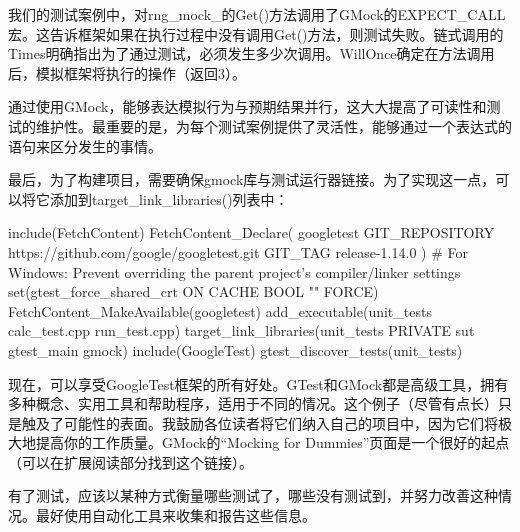 我们的测试案例中，对rng\_mock\_的Get()方法调用了GMock的EXPECT\_CALL宏。这告诉框架如果在执行过程中没有调用Get()方法，则测试失败。链式调用的Times明确指出为了通过测试，必须发生多少次调用。WillOnce确定在方法调用后，模拟框架将执行的操作（返回3）。

通过使用GMock，能够表达模拟行为与预期结果并行，这大大提高了可读性和测试的维护性。最重要的是，为每个测试案例提供了灵活性，能够通过一个表达式的语句来区分发生的事情。

最后，为了构建项目，需要确保gmock库与测试运行器链接。为了实现这一点，可以将它添加到target\_link\_libraries()列表中：


\begin{cmake}
include(FetchContent)
FetchContent_Declare(
    googletest
    GIT_REPOSITORY https://github.com/google/googletest.git
    GIT_TAG release-1.14.0
)
# For Windows: Prevent overriding the parent project's compiler/linker settings
set(gtest_force_shared_crt ON CACHE BOOL "" FORCE)
FetchContent_MakeAvailable(googletest)
add_executable(unit_tests
               calc_test.cpp
               run_test.cpp)
target_link_libraries(unit_tests PRIVATE sut gtest_main gmock)
include(GoogleTest)
gtest_discover_tests(unit_tests)
\end{cmake}

现在，可以享受GoogleTest框架的所有好处。GTest和GMock都是高级工具，拥有多种概念、实用工具和帮助程序，适用于不同的情况。这个例子（尽管有点长）只是触及了可能性的表面。我鼓励各位读者将它们纳入自己的项目中，因为它们将极大地提高你的工作质量。GMock的“Mocking for Dummies”页面是一个很好的起点（可以在扩展阅读部分找到这个链接）。

有了测试，应该以某种方式衡量哪些测试了，哪些没有测试到，并努力改善这种情况。最好使用自动化工具来收集和报告这些信息。

















